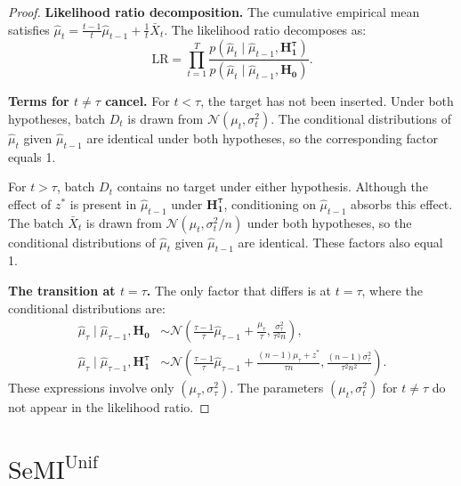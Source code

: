 \documentclass{article}
\theoremstyle{plain}
\theoremstyle{definition}
\theoremstyle{remark}
\newcommand{\cN}{\ensuremath{\mathcal{N}}}
\newcommand{\SeMIunif}{\mathrm{SeMI}^{\mathrm{Unif}}}
\begin{document}
\begin{proof}
    \textbf{Likelihood ratio decomposition.}
    The cumulative empirical mean satisfies $\hat{\mu}_t = \frac{t-1}{t}\hat{\mu}_{t-1} + \frac{1}{t}\bar{X}_t$. The likelihood ratio decomposes as:
    \begin{equation*}
        \mathrm{LR} = \prod_{t=1}^{T} \frac{p(\hat{\mu}_t \mid \hat{\mu}_{t-1}, \mathbf{H_1^\tau})}{p(\hat{\mu}_t \mid \hat{\mu}_{t-1}, \mathbf{H_0})}.
    \end{equation*}

    \textbf{Terms for $t \neq \tau$ cancel.}
    For $t < \tau$, the target has not been inserted. Under both hypotheses, batch $D_t$ is drawn from $\mathcal{N}(\mu_t, \sigma_t^2)$. The conditional distributions of $\hat{\mu}_t$ given $\hat{\mu}_{t-1}$ are identical under both hypotheses, so the corresponding factor equals 1.

    For $t > \tau$, batch $D_t$ contains no target under either hypothesis. Although the effect of $z^*$ is present in $\hat{\mu}_{t-1}$ under $\mathbf{H_1^\tau}$, conditioning on $\hat{\mu}_{t-1}$ absorbs this effect. The batch $\bar{X}_t$ is drawn from $\mathcal{N}(\mu_t, \sigma_t^2/n)$ under both hypotheses, so the conditional distributions of $\hat{\mu}_t$ given $\hat{\mu}_{t-1}$ are identical. These factors also equal 1.

    \textbf{The transition at $t = \tau$.}
    The only factor that differs is at $t = \tau$, where the conditional distributions are:
    \begin{align*}
        \hat{\mu}_\tau \mid \hat{\mu}_{\tau-1}, \mathbf{H_0}      & \sim \cN\left(\frac{\tau-1}{\tau}\hat{\mu}_{\tau-1} + \frac{\mu_\tau}{\tau}, \frac{\sigma_\tau^2}{\tau^2 n}\right),                     \\
        \hat{\mu}_\tau \mid \hat{\mu}_{\tau-1}, \mathbf{H_1^\tau} & \sim \cN\left(\frac{\tau-1}{\tau}\hat{\mu}_{\tau-1} + \frac{(n-1)\mu_\tau + z^*}{\tau n}, \frac{(n-1)\sigma_\tau^2}{\tau^2 n^2}\right).
    \end{align*}
    These expressions involve only $(\mu_\tau, \sigma_\tau^2)$. The parameters $(\mu_t, \sigma_t^2)$ for $t \neq \tau$ do not appear in the likelihood ratio.
\end{proof}


%
\section{$\SeMIunif$}
\label{app:uniform-prior-proofs}
\end{document}
